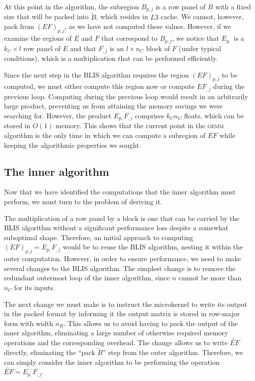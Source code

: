 \documentclass[12pt]{article}
\newcommand*{\gemm}{{\textsc{gemm}}}
\begin{document}
At this point in the algorithm, the subregion $B_{p, j}$ is a row panel of $B$ with a fixed size that will be packed into $\widetilde{B}$, which resides in $L3$ cache.
We cannot, however, pack from $(EF)_{p, j}$, as we have not computed these values.
However, if we examine the regions of $E$ and $F$ that correspond to $B_{p, j}$, we notice that $E_{p,}$ is a $k_C \times l$ row panel of $E$ and that $F_{,j}$ is an $l \times n_C$ block of $F$ (under typical conditions), which is a multiplication that can be performed efficiently.

Since the next step in the BLIS algorithm requires the region $(EF)_{p, j}$ to be computed, we must either compute this region now or compute $EF_{,j}$ during the previous loop.
Computing during the previous loop would result in an arbitrarily large product, preventing us from attaining the memory savings we were searching for.
However, the product $E_{p,}F_{,j}$ comprises $k_Cn_C$ floats, which can be stored in $O(1)$ memory.
This shows that the current point in the \gemm{} algorithm is the only time in which we can compute a subregion of $EF$ while keeping the algorithmic properties we sought.

\subsection{The inner algorithm}
Now that we have identified the computations that the inner algorithm must perform, we must turn to the problem of deriving it.

The multiplication of a row panel by a block is one that can be carried by the BLIS algorithm without a significant performance loss despite a somewhat suboptimal shape.
Therefore, an initial approach to computing $(EF)_{p, j} = E_{p,}F_{,j}$ would be to reuse the BLIS algorithm, nesting it within the outer computation.
However, in order to ensure performance, we need to make several changes to the BLIS algorithm.
The simplest change is to remove the redundant outermost loop of the inner algorithm, since $n$ cannot be more than $n_C$ for its inputs.

The next change we must make is to instruct the microkernel to write its output in the packed format by informing it the output matrix is stored in row-major form with width $n_R$.
This allows us to avoid having to pack the output of the inner algorithm, eliminating a large number of otherwise required memory operations and the corresponding overhead.
The change allows us to write $\widetilde{EF}$ directly, eliminating the ``pack $\widetilde{B}$'' step from the outer algorithm.
Therefore, we can simply consider the inner algorithm to be performing the operation $\widetilde{EF} = E_{p,}F_{,j}$.
\end{document}
